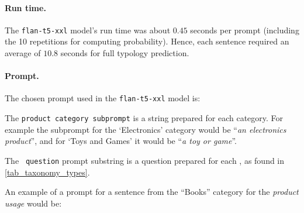 \paragraph{Run time.}
The \texttt{flan-t5-xxl} model's run time was about $0.45$ seconds per prompt (including the 10 repetitions for computing probability). Hence, each sentence required an average of $10.8$ seconds for full typology prediction.

\paragraph{Prompt.}
The chosen prompt used in the \texttt{flan-t5-xxl} model is:

\begin{table}[h]
    \vspace{-2mm}
    \centering
    \vspace{-4mm}
\end{table}

The \texttt{product category subprompt} is a string prepared for each category. For example the subprompt for the `Electronics' category would be ``\textit{an electronics product}'', and for `Toys and Games' it would be ``\textit{a toy or game}''.

The \texttt{\taxtype{} question} prompt substring is a question prepared for each \taxtype{}, as found in \autoref{tab_taxonomy_types}.

An example of a prompt for a sentence from the ``Books'' category for the \textit{product usage} \taxtype{} would be:

\begin{table}[h]
    \vspace{-2mm}
    \centering
\end{table}

